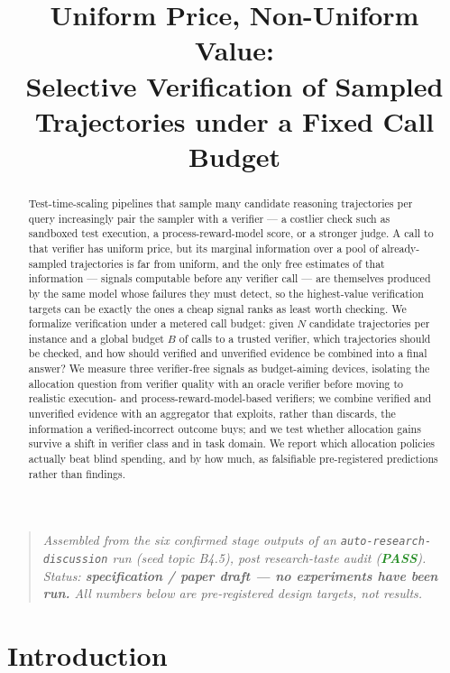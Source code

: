 \documentclass[11pt]{article}
\title{\textbf{Uniform Price, Non-Uniform Value:\\ Selective Verification of Sampled Trajectories under a Fixed Call Budget}}
\author{}
\date{}
\begin{document}
\maketitle
\vspace{-2em}

\begin{quote}
\small\textit{Assembled from the six confirmed stage outputs of an \texttt{auto-research-discussion} run (seed topic B4.5), post research-taste audit (\textcolor{ForestGreen}{\textbf{PASS}}). Status: \textbf{specification / paper draft --- no experiments have been run.} All numbers below are pre-registered design targets, not results.}
\end{quote}

\begin{abstract}
Test-time-scaling pipelines that sample many candidate reasoning trajectories per query increasingly pair the sampler with a verifier --- a costlier check such as sandboxed test execution, a process-reward-model score, or a stronger judge. A call to that verifier has uniform price, but its marginal information over a pool of already-sampled trajectories is far from uniform, and the only free estimates of that information --- signals computable before any verifier call --- are themselves produced by the same model whose failures they must detect, so the highest-value verification targets can be exactly the ones a cheap signal ranks as least worth checking. We formalize verification under a metered call budget: given $N$ candidate trajectories per instance and a global budget $B$ of calls to a trusted verifier, which trajectories should be checked, and how should verified and unverified evidence be combined into a final answer? We measure three verifier-free signals as budget-aiming devices, isolating the allocation question from verifier quality with an oracle verifier before moving to realistic execution- and process-reward-model-based verifiers; we combine verified and unverified evidence with an aggregator that exploits, rather than discards, the information a verified-incorrect outcome buys; and we test whether allocation gains survive a shift in verifier class and in task domain. We report which allocation policies actually beat blind spending, and by how much, as falsifiable pre-registered predictions rather than findings.
\end{abstract}

\section{Introduction}
\end{document}
